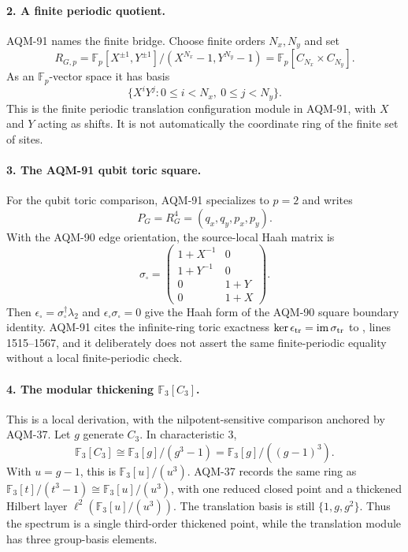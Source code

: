 \paragraph{2. A finite periodic quotient.}
AQM-91 names the finite bridge.  Choose finite orders \(N_x,N_y\) and set
\[
  R_{G,p}=
  \mathbb F_p[X^{\pm1},Y^{\pm1}]/(X^{N_x}-1,Y^{N_y}-1)
  =\mathbb F_p[C_{N_x}\times C_{N_y}].
\]
As an \(\mathbb F_p\)-vector space it has basis
\[
  \{X^iY^j:0\le i<N_x,\ 0\le j<N_y\}.
\]
This is the finite periodic translation configuration module in AQM-91, with
\(X\) and \(Y\) acting as shifts.  It is not automatically the coordinate ring
of the finite set of sites.

\paragraph{3. The AQM-91 qubit toric square.}
For the qubit toric comparison, AQM-91 specializes to \(p=2\) and writes
\[
  P_G=R_G^4=(q_x,q_y,p_x,p_y).
\]
With the AQM-90 edge orientation, the source-local Haah matrix is
\[
  \sigma_\square=
  \begin{pmatrix}
  1+X^{-1} & 0\\
  1+Y^{-1} & 0\\
  0 & 1+Y\\
  0 & 1+X
  \end{pmatrix}.
\]
Then \(\epsilon_\square=\sigma_\square^\dagger\lambda_2\) and
\(\epsilon_\square\sigma_\square=0\) give the Haah form of the AQM-90 square
boundary identity.  AQM-91 cites the infinite-ring toric exactness
\(\ker\epsilon_{\rm tr}=\operatorname{im}\sigma_{\rm tr}\) to
,
lines 1515--1567, and it deliberately does not assert the same finite-periodic
equality without a local finite-periodic check.

\paragraph{4. The modular thickening \( \mathbb F_3[C_3]\).}
This is a local derivation, with the nilpotent-sensitive comparison anchored
by AQM-37.  Let \(g\) generate \(C_3\).  In characteristic \(3\),
\[
  \mathbb F_3[C_3]\cong\mathbb F_3[g]/(g^3-1)
  =\mathbb F_3[g]/((g-1)^3).
\]
With \(u=g-1\), this is \(\mathbb F_3[u]/(u^3)\).  AQM-37 records the same
ring as \(\mathbb F_3[t]/(t^3-1)\cong\mathbb F_3[u]/(u^3)\), with one reduced
closed point and a thickened Hilbert layer
\(\ell^2(\mathbb F_3[u]/(u^3))\).  The translation basis is still
\(\{1,g,g^2\}\).  Thus the spectrum is a single third-order thickened point,
while the translation module has three group-basis elements.

